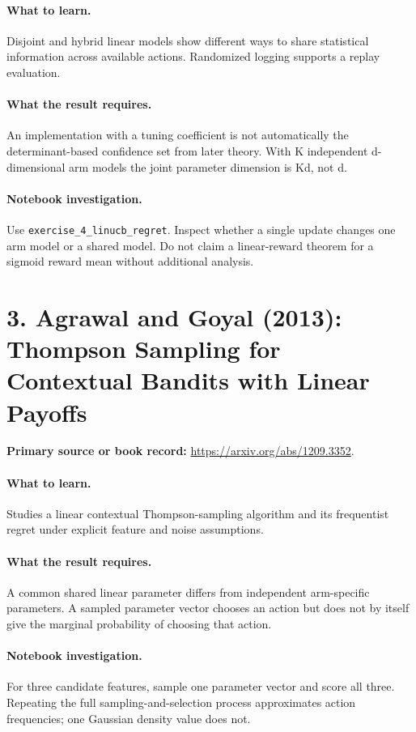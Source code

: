 \documentclass[11pt]{scrartcl}
\begin{document}
\paragraph{What to learn.} Disjoint and hybrid linear models show different ways to share statistical information across available actions. Randomized logging supports a replay evaluation.

\paragraph{What the result requires.} An implementation with a tuning coefficient is not automatically the determinant-based confidence set from later theory. With K independent d-dimensional arm models the joint parameter dimension is Kd, not d.

\paragraph{Notebook investigation.} Use \texttt{exercise\_4\_linucb\_regret}. Inspect whether a single update changes one arm model or a shared model. Do not claim a linear-reward theorem for a sigmoid reward mean without additional analysis.

\section*{3. Agrawal and Goyal (2013): Thompson Sampling for Contextual Bandits with Linear Payoffs}
\textbf{Primary source or book record:} \url{https://arxiv.org/abs/1209.3352}.

\paragraph{What to learn.} Studies a linear contextual Thompson-sampling algorithm and its frequentist regret under explicit feature and noise assumptions.

\paragraph{What the result requires.} A common shared linear parameter differs from independent arm-specific parameters. A sampled parameter vector chooses an action but does not by itself give the marginal probability of choosing that action.

\paragraph{Notebook investigation.} For three candidate features, sample one parameter vector and score all three. Repeating the full sampling-and-selection process approximates action frequencies; one Gaussian density value does not.
\end{document}
